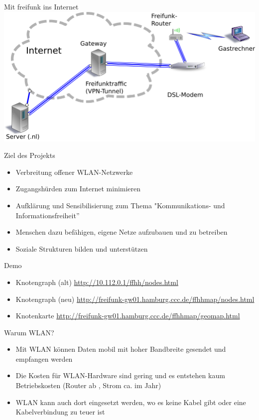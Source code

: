 \documentclass[c]{beamer}
\begin{document}
\begin{frame}{Mit freifunk ins Internet}
	\includegraphics[width=\textwidth]{Freifunk_Knotenanbindung}
\end{frame}


\begin{frame}{Ziel des Projekts}
	\begin{itemize}
		\item Verbreitung offener WLAN-Netzwerke
		\item Zugangshürden zum Internet minimieren
		\item Aufklärung und Sensibilisierung zum Thema "Kommunikations- und Informationsfreiheit''
		\item Menschen dazu befähigen, eigene Netze aufzubauen und zu betreiben
		\item Soziale Strukturen bilden und unterstützen
	\end{itemize}
\end{frame}


\begin{frame}{Demo}
	\begin{itemize}
		\item Knotengraph (alt) \href{http://10.112.0.1/ffhh/nodes.html}{http://10.112.0.1/ffhh/nodes.html}
		\item Knotengraph (neu)  \href{http://freifunk-gw01.hamburg.ccc.de/ffhhmap/nodes.html}{http://freifunk-gw01.hamburg.ccc.de/ffhhmap/nodes.html}
		\item Knotenkarte \href{http://freifunk-gw01.hamburg.ccc.de/ffhhmap/geomap.html}{http://freifunk-gw01.hamburg.ccc.de/ffhhmap/geomap.html}
	\end{itemize}
\end{frame}



\begin{frame}{Warum WLAN?}
	\begin{itemize}
		\item Mit WLAN können Daten mobil mit hoher Bandbreite gesendet und empfangen werden
		\item Die Kosten für WLAN-Hardware sind gering und es entstehen kaum Betriebskosten (Router ab , Strom ca.  im Jahr)
		\item WLAN kann auch dort eingesetzt werden, wo es keine Kabel gibt oder eine Kabelverbindung zu teuer ist
	\end{itemize}
\end{frame}
\end{document}
